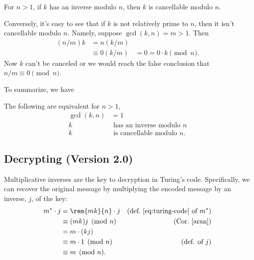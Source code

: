 \begin{lemma}\label{lem:cancellation-arb}
For $n>1$, if $k$ has an inverse modulo $n$, then $k$ is cancellable
modulo $n$.
\end{lemma}

\iffalse
\begin{proof}
In the left hand congruence, multiply both sides by an inverse $j$ of $k$ to obtain
\[
(ak)j \equiv (bk)j \pmod{n}.
\]
Since $kj \equiv 1 \pmod{n}$, this immediately simplifies to $a \equiv
b \pmod{n}$.
\end{proof}
\fi

Conversely, it's easy to see that if $k$ is not relatively prime to
$n$, then it isn't cancellable modulo $n$.  Namely, suppose $\gcd(k,n)
= m >1$.  Then
\begin{align*}
(n/m)k & = n (k/m)\\
       & \equiv 0 (k/m)
       & = 0 = 0 \cdot k \pmod n.
\end{align*}
Now $k$ can't be canceled or we would reach the false conclusion
that $n/m \equiv 0 \pmod n$.

To summarize, we have
\begin{theorem}\label{thm:mod_inverses}
The following are equivalent for $n >1$,
\begin{align}
\gcd(k, n)& = 1\\
k & \text{ has an inverse modulo } n\\
k & \text{ is cancellable modulo } n.
\end{align}
\end{theorem}

\subsection{Decrypting (Version 2.0)}

Multiplicative inverses are the key to decryption in Turing's code.  Specifically, we can
recover the original message by multiplying the encoded message by an inverse, $j$, of
the key:
\begin{align*}
m^* \cdot j
  & = \rem{mk}{n} \cdot j & \text{(def.~\eqref{eq:turing-code} of $m^*$)}\\
  & \equiv (mk)j \pmod{n} & \text{(Cor.~\ref{aran})}\\
  & = m \cdot (kj)\\
  & \equiv m \cdot 1 \pmod{n} & \text{(def. of $j$)}\\
  & \equiv m \pmod{n}.
\end{align*}

